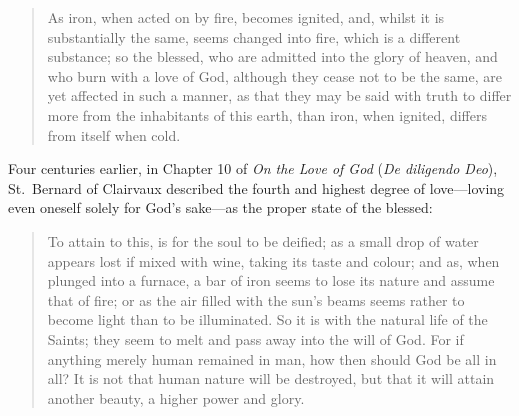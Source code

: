 \begin{quote}
As iron, when acted on by fire, becomes ignited, and, whilst it is substantially the same, seems changed into fire, which is a different substance; so the blessed, who are admitted into the glory of heaven, and who burn with a love of God, although they cease not to be the same, are yet affected in such a manner, as that they may be said with truth to differ more from the inhabitants of this earth, than iron, when ignited, differs from itself when cold.
\end{quote}

Four centuries earlier, in Chapter 10 of \textit{On the Love of God} (\textit{De diligendo Deo}), St.\ Bernard of Clairvaux described the fourth and highest degree of love---loving even oneself solely for God's sake---as the proper state of the blessed:

\begin{quote}
To attain to this, is for the soul to be deified; as a small drop of water appears lost if mixed with wine, taking its taste and colour; and as, when plunged into a furnace, a bar of iron seems to lose its nature and assume that of fire; or as the air filled with the sun's beams seems rather to become light than to be illuminated. So it is with the natural life of the Saints; they seem to melt and pass away into the will of God. For if anything merely human remained in man, how then should God be all in all? It is not that human nature will be destroyed, but that it will attain another beauty, a higher power and glory.
\end{quote}
